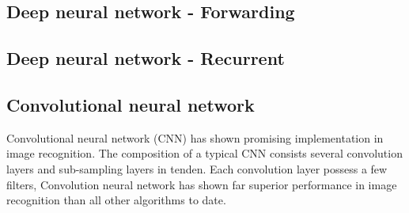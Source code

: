 \subsection{Deep neural network - Forwarding}
\subsection{Deep neural network - Recurrent}
\subsection{Convolutional neural network}
Convolutional neural network (CNN) has shown promising implementation in image recognition. The composition of a typical CNN consists several convolution layers and sub-sampling layers in tenden. Each convolution layer possess a few filters, 
Convolution neural network has shown far superior performance in image recognition than all other algorithms to date.~\cite{Szegedy_2015}